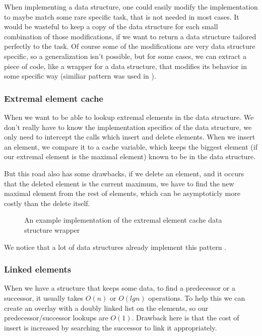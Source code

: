 \documentclass[a4paper,11pt]{article}
\begin{document}
		When implementing a data structure, one could easily modify the implementation to maybe match some rare
		specific task, that is not needed in most cases. It would be wasteful to keep a copy of the data
		structure for each small combination of those modifications, if we want to return a data structure
		tailored perfectly to the task. Of course some of the modifications are very data structure specific, so
		a generalization isn't possible, but for some cases, we can extract a piece of code, like a wrapper for
        a data structure, that modifies its behavior in some specific way (similiar pattern was used in
        \cite{Okasaki}).

		\subsubsection{Extremal element cache}

			When we want to be able to lookup extremal elements in the data structure. We don't really have
			to know the implementation specifics of the data structure, we only need to intercept the calls
			which insert and delete elements. When we insert an element, we compare it to a cache variable,
			which keeps the biggest element (if our extremal element is the maximal element) known to be in
			the data structure.

			But this road also has some drawbacks, if we delete an element, and it occurs that the deleted
			element is the current maximum, we have to find the new maximal element from the rest of
			elements, which can be asymptoticly more costly than the delete itself.


			\begin{figure}
				

				\caption{An example implementation of the extremal element cache data structure wrapper}

				\label{fig:elem-cache}
			\end{figure}

			We notice that a lot of data structures already implement this pattern \cite{Wiveb}.

        \subsubsection{Linked elements}\label{sec:gdsm:le}

			When we have a structure that keeps some data, to find a predecessor or a successor, it usually
			takes $O(n)$ or $O(lg n)$ operations.  To help this we can create an overlay with a doubly
			linked list on the elements, so our predecessor/successor lookups are $O(1)$. Drawback here is
			that the cost of insert is increased by searching the successor to link it appropriately.
\end{document}
